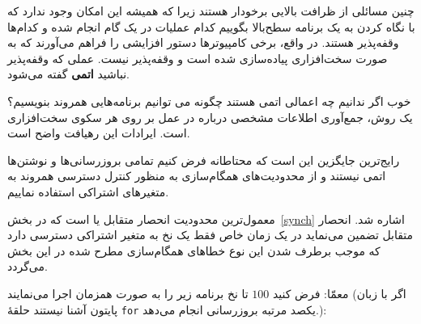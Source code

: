 \documentclass{book}
\begin{document}
    چنین مسائلی از ظرافت بالایی برخودار هستند 
    زیرا که     همیشه این امکان وجود ندارد که با نگاه کردن به یک برنامه سطح‌بالا 
    بگوییم کدام عملیات در یک گام انجام شده و کدام‌ها وقفه‌پذیر هستند. 
    در واقع،‌ برخی کامپیوترها دستور افزایشی را فراهم می‌آورند که به صورت سخت‌افزاری پیاده‌سازی شده است و وقفه‌پذیر نیست. 
    عملی که وقفه‌پذیر نباشید \textbf{اتمی} گفته می‌شود. 

    خوب اگر ندانیم چه اعمالی اتمی هستند چگونه می توانیم برنامه‌هایی همروند بنویسیم؟
    یک روش، جمع‌آوری اطلاعات مشخصی درباره در عمل بر روی هر سکوی سخت‌افزاری است. 
    ایرادات این رهیافت  واضح است. 

    رایج‌ترین جایگزین این است که محتاطانه فرض کنیم تمامی بروزرسانی‌ها و نوشتن‌ها اتمی نیستند و 
    از محدودیت‌های همگام‌سازی به منظور کنترل دسترسی همروند به متغیرهای اشتراکی استفاده نماییم. 

    معمول‌ترین محدودیت انحصار متقابل یا  است که 
    در بخش~\ref{synch}  اشاره شد. انحصار متقابل تضمین می‌نماید در یک زمان خاص  فقط یک نخ به متغیر اشتراکی دسترسی دارد 
    که موجب برطرف شدن این نوع خطاهای همگام‌سازی مطرح شده در این بخش می‌گردد. 
    
    معمّا: فرض کنید $100$ تا نخ برنامه زیر را به صورت همزمان اجرا می‌نمایند (اگر با زبان پایتون آشنا نیستند حلقهٔ \texttt{for} یکصد مرتبه 
    بروزرسانی انجام می‌دهد.):
\end{document}
